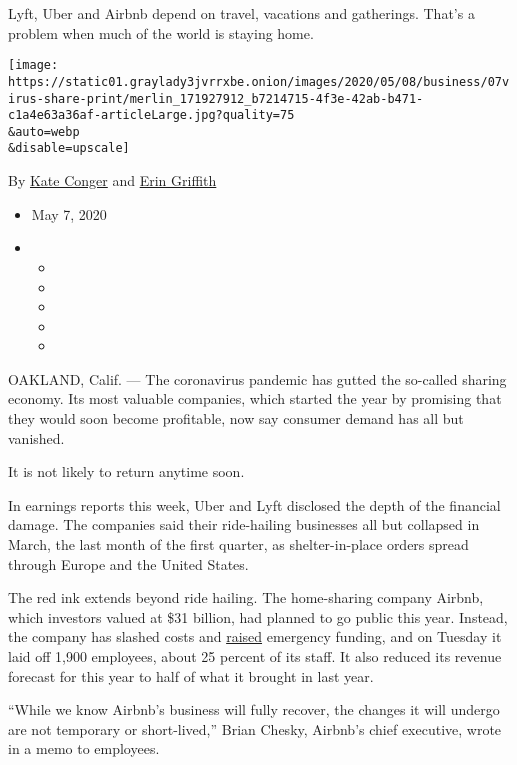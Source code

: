 Lyft, Uber and Airbnb depend on travel, vacations and gatherings. That's
a problem when much of the world is staying home.

\texttt{[image: https://static01.graylady3jvrrxbe.onion/images/2020/05/08/business/07virus-share-print/merlin\_171927912\_b7214715-4f3e-42ab-b471-c1a4e63a36af-articleLarge.jpg?quality=75\\\&auto=webp\\\&disable=upscale]}

By \href{https://www.nytimes3xbfgragh.onion/by/kate-conger}{Kate Conger}
and \href{https://www.nytimes3xbfgragh.onion/by/erin-griffith}{Erin
Griffith}

\begin{itemize}
\item
  May 7, 2020
\item
  \begin{itemize}
  \item
  \item
  \item
  \item
  \item
  \end{itemize}
\end{itemize}

OAKLAND, Calif. --- The coronavirus pandemic has gutted the so-called
sharing economy. Its most valuable companies, which started the year by
promising that they would soon become profitable, now say consumer
demand has all but vanished.

It is not likely to return anytime soon.

In earnings reports this week, Uber and Lyft disclosed the depth of the
financial damage. The companies said their ride-hailing businesses all
but collapsed in March, the last month of the first quarter, as
shelter-in-place orders spread through Europe and the United States.

The red ink extends beyond ride hailing. The home-sharing company
Airbnb, which investors valued at \$31 billion, had planned to go public
this year. Instead, the company has slashed costs and
\href{https://www.nytimes3xbfgragh.onion/2020/04/06/technology/airbnb-coronavirus-valuation.html}{raised}
emergency funding, and on Tuesday it laid off 1,900 employees, about 25
percent of its staff. It also reduced its revenue forecast for this year
to half of what it brought in last year.

``While we know Airbnb's business will fully recover, the changes it
will undergo are not temporary or short-lived,'' Brian Chesky, Airbnb's
chief executive, wrote in a memo to employees.

